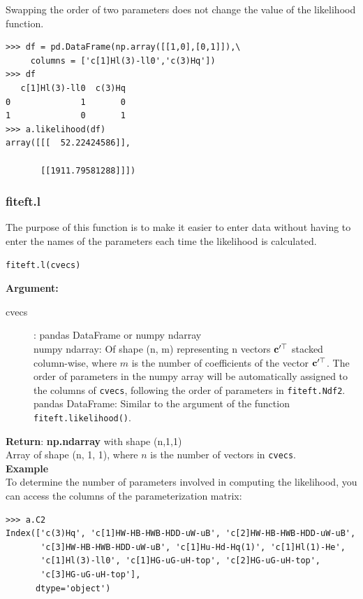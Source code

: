 \documentclass[12pt]{article}
\def\b#1{\boldsymbol{\rm #1}}
\begin{document}
Swapping the order of two parameters does not change the value of the likelihood function.
\begin{verbatim}
>>> df = pd.DataFrame(np.array([[1,0],[0,1]]),\
     columns = ['c[1]Hl(3)-ll0','c(3)Hq'])
>>> df
   c[1]Hl(3)-ll0  c(3)Hq
0              1       0
1              0       1
>>> a.likelihood(df)
array([[[  52.22424586]],

       [[1911.79581288]]])
  \end{verbatim}

\subsubsection{fiteft.l}
The purpose of this function is to make it easier to enter data without having to enter the names of the parameters each time the likelihood is calculated.
\begin{verbatim}
fiteft.l(cvecs)
\end{verbatim}
\textbf{Argument:}
\begin{description}
  \item[cvecs]: pandas DataFrame or numpy ndarray\\
  numpy ndarray: Of shape (n, m) representing n vectors $\b c'^\top$ stacked column-wise, where $m$ is the number of coefficients of the vector $\b c'^\top$. The order of parameters in the numpy array will be automatically assigned to the columns of \verb|cvecs|, following the order of parameters in  \verb|fiteft.Ndf2|.\\
  pandas DataFrame: Similar to the argument of the function \verb|fiteft.likelihood()|.
 \end{description}
 \textbf{Return}: \textbf{np.ndarray} with shape (n,1,1)\\
 \indent Array of shape (n, 1, 1), where $n$ is the number of vectors in \verb|cvecs|.
 \\[1cm]
 \textbf{Example}\\
 To determine the number of parameters involved in computing the likelihood, you can access the columns of the parameterization matrix:
 \begin{verbatim}
>>> a.C2
Index(['c(3)Hq', 'c[1]HW-HB-HWB-HDD-uW-uB', 'c[2]HW-HB-HWB-HDD-uW-uB',
       'c[3]HW-HB-HWB-HDD-uW-uB', 'c[1]Hu-Hd-Hq(1)', 'c[1]Hl(1)-He',
       'c[1]Hl(3)-ll0', 'c[1]HG-uG-uH-top', 'c[2]HG-uG-uH-top',
       'c[3]HG-uG-uH-top'],
      dtype='object')
 \end{verbatim}
\end{document}
